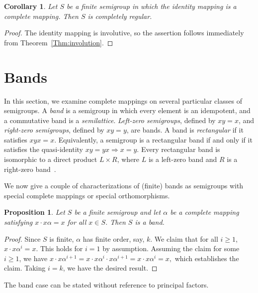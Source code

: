 \documentclass[11pt]{article}
\theoremstyle{plain}
\newtheorem{prop}[theorem]{Proposition}
\newtheorem{cor}[theorem]{Corollary}
\theoremstyle{remark}
\theoremstyle{definition}
\theoremstyle{plain}
\begin{document}
\begin{cor}
Let $S$ be a finite semigroup in which the identity mapping is a complete mapping. Then $S$ is completely regular.
\end{cor}

\begin{proof}
The identity mapping is involutive, so the assertion follows immediately from
Theorem~\ref{Thm:involution}.
\end{proof}

\section{Bands}
\label{Sec:bands}

In this section, we examine complete mappings on several particular classes of semigroups. A \emph{band} is a semigroup in which every element is an idempotent, and a commutative band is a \emph{semilattice}. \emph{Left-zero semigroups}, defined by $xy=x$, and \emph{right-zero semigroups}, defined by $xy=y$, are bands. A band is \emph{rectangular} if it satisfies $xyx=x$. Equivalently, a semigroup is a rectangular band if and only if it satisfies the quasi-identity $xy=yx\Rightarrow x=y$. Every rectangular band is isomorphic to a direct product $L\times R$, where $L$ is a left-zero band and $R$ is a right-zero band~\cite[Theorem~1.1.3]{Howie}.

We now give a couple of characterizations of (finite) bands as semigroups with special complete mappings or special orthomorphisms.

\begin{prop}\label{Prp:id_ortho_band}
Let $S$ be a finite semigroup and let $\alpha$ be a complete
mapping satisfying $x\cdot x\alpha=x$ for all $x\in S$. Then $S$ is a
band.
\end{prop}
\begin{proof}
Since $S$ is finite, $\alpha$ has finite order, say, $k$. We claim that for all $i\ge 1$, $x\cdot x\alpha^i=x$. This holds for $i=1$ by assumption. Assuming the claim for some $i\ge 1$, we have
\(x\cdot x\alpha^{i+1} = x\cdot x\alpha^i\cdot x\alpha^{i+1} = x\cdot x\alpha^i = x,\)
which establishes the claim. Taking $i=k$, we have the desired result.
\end{proof}

The band case can be stated without reference to principal factors.
\end{document}
